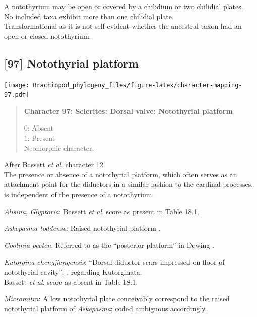 \documentclass[openany]{book}
\begin{document}
A notothyrium may be open or covered by a chilidium or two chilidial
plates.\\
No included taxa exhibit more than one chilidial plate.\\
Transformational as it is not self-evident whether the ancestral taxon
had an open or closed notothyrium.

\subsection*{{[}97{]} Notothyrial platform}\label{notothyrial-platform}

\texttt{[image: Brachiopod\_phylogeny\_files/figure-latex/character-mapping-97.pdf]}

\begin{quote}
\textbf{Character 97: Sclerites: Dorsal valve: Notothyrial platform}

0: Absent\\
1: Present\\
Neomorphic character.
\end{quote}

After Bassett \emph{et al}.
\citeyearpar{Bassett2001Functionalmorphology} character 12.\\
The presence or absence of a notothyrial platform, which often serves as
an attachment point for the diductors in a similar fashion to the
cardinal processes, is independent of the presence of a notothyrium.

\hypertarget{Alisina-coding-97}{}
\emph{Alisina}, \emph{Glyptoria}: Bassett \emph{et al}.
\citeyearpar{Bassett2001Functionalmorphology} score as present in Table
18.1.

\hypertarget{Askepasma_toddense-coding-97}{}
\emph{Askepasma toddense}: Raised notothyrial platform
\citep{Williams1998Thediversity}.

\hypertarget{Coolinia_pecten-coding-97}{}
\emph{Coolinia pecten}: Referred to as the ``posterior platform'' in
Dewing \citeyearpar{Dewing2001Hingemodifications}.

\hypertarget{Kutorgina_chengjiangensis-coding-97}{}
\emph{Kutorgina chengjiangensis}: ``Dorsal diductor scars impressed on
floor of notothyrial cavity'':
\citet{Williams2000LinguliformeaCraniiformea}, regarding Kutorginata.\\
Bassett \emph{et al}. \citeyearpar{Bassett2001Functionalmorphology}
score as absent in Table 18.1.

\hypertarget{Micromitra-coding-97}{}
\emph{Micromitra}: A low notothyrial plate
\citep{Williams1998Thediversity} conceivably correspond to the raised
notothyrial platform of \emph{Askepasma}; coded ambiguous accordingly.
\end{document}
